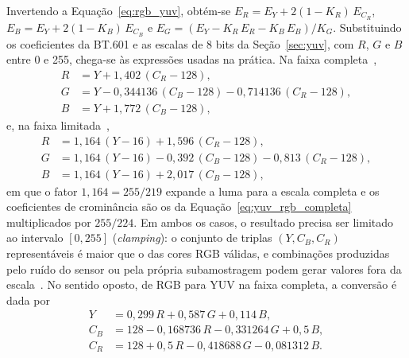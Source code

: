 Invertendo a Equação~\ref{eq:rgb_yuv}, obtém-se $E_R = E_Y + 2(1 - K_R)\,E_{C_R}$, $E_B = E_Y + 2(1 - K_B)\,E_{C_B}$ e $E_G = (E_Y - K_R\,E_R - K_B\,E_B)/K_G$. Substituindo os coeficientes da BT.601 e as escalas de 8 bits da Seção~\ref{sec:yuv}, com $R$, $G$ e $B$ entre 0 e 255, chega-se às expressões usadas na prática. Na faixa completa~\cite{itu_t871},
\begin{equation}
    \begin{aligned}
        R &= Y + 1{,}402\,(C_R - 128),\\
        G &= Y - 0{,}344136\,(C_B - 128) - 0{,}714136\,(C_R - 128),\\
        B &= Y + 1{,}772\,(C_B - 128),
    \end{aligned}
    \label{eq:yuv_rgb_completa}
\end{equation}
e, na faixa limitada~\cite{poynton2012digital},
\begin{equation}
    \begin{aligned}
        R &= 1{,}164\,(Y - 16) + 1{,}596\,(C_R - 128),\\
        G &= 1{,}164\,(Y - 16) - 0{,}392\,(C_B - 128) - 0{,}813\,(C_R - 128),\\
        B &= 1{,}164\,(Y - 16) + 2{,}017\,(C_B - 128),
    \end{aligned}
    \label{eq:yuv_rgb_limitada}
\end{equation}
em que o fator $1{,}164 = 255/219$ expande a luma para a escala completa e os coeficientes de crominância são os da Equação~\ref{eq:yuv_rgb_completa} multiplicados por $255/224$. Em ambos os casos, o resultado precisa ser limitado ao intervalo $[0, 255]$ (\textit{clamping}): o conjunto de triplas $(Y, C_B, C_R)$ representáveis é maior que o das cores RGB válidas, e combinações produzidas pelo ruído do sensor ou pela própria subamostragem podem gerar valores fora da escala~\cite{poynton2012digital}. No sentido oposto, de RGB para YUV na faixa completa, a conversão é dada por~\cite{itu_t871}
\begin{equation}
    \begin{aligned}
        Y &= 0{,}299\,R + 0{,}587\,G + 0{,}114\,B,\\
        C_B &= 128 - 0{,}168736\,R - 0{,}331264\,G + 0{,}5\,B,\\
        C_R &= 128 + 0{,}5\,R - 0{,}418688\,G - 0{,}081312\,B.
    \end{aligned}
    \label{eq:rgb_yuv_completa}
\end{equation}

